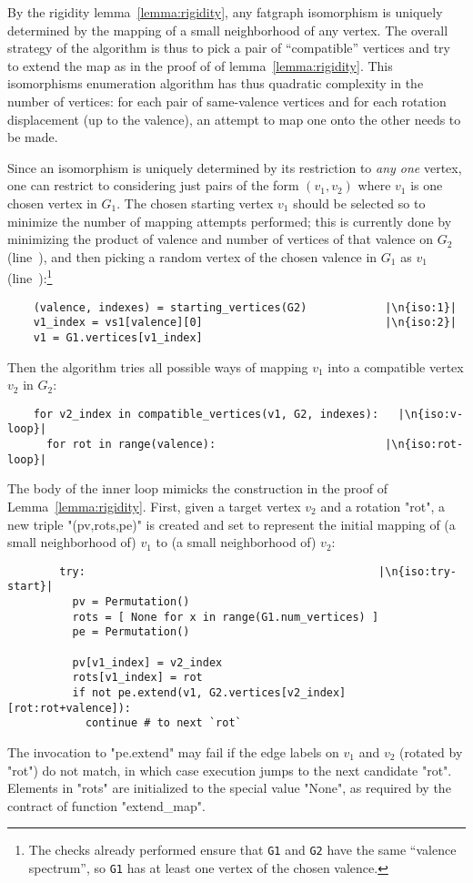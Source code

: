 By the rigidity lemma~\ref{lemma:rigidity}, any fatgraph isomorphism
is uniquely determined by the mapping of a small neighborhood of any
vertex.  The overall strategy of the algorithm is thus to pick a pair
of ``compatible'' vertices and try to extend the map as in the proof
of of lemma~\ref{lemma:rigidity}.  This isomorphisms enumeration
algorithm has thus quadratic complexity in the number of
vertices: for each pair of same-valence vertices and for each
rotation displacement (up to the valence), an attempt to map one onto
the other needs to be made.  

Since an isomorphism is uniquely determined by its restriction to
\emph{any one} vertex, one can restrict to considering just pairs of
the form $(v_1, v_2)$ where $v_1$ is one chosen vertex in $G_1$.  The
chosen starting vertex $v_1$ should be selected so to minimize the
number of mapping attempts performed; this is currently done by
minimizing the product of valence and number of vertices of that
valence on $G_2$ (line~), and then picking a random vertex
of the chosen valence in $G_1$ as $v_1$
(line~):\footnote{The checks already performed ensure that
  \Verb`G1` and \Verb`G2` have the same ``valence spectrum'', so
  \Verb`G1` has at least one vertex of the chosen valence.}
\begin{lstlisting}
    (valence, indexes) = starting_vertices(G2)            |\n{iso:1}|
    v1_index = vs1[valence][0]                            |\n{iso:2}|
    v1 = G1.vertices[v1_index]
\end{lstlisting}
Then the algorithm tries all possible ways of mapping $v_1$ into a
compatible vertex $v_2$ in $G_2$:
\begin{lstlisting}
    for v2_index in compatible_vertices(v1, G2, indexes):   |\n{iso:v-loop}|
      for rot in range(valence):                          |\n{iso:rot-loop}|
\end{lstlisting}
The body of the inner loop mimicks the construction in the proof
of Lemma~\ref{lemma:rigidity}.  First, given a target vertex $v_2$ and a
rotation "rot", a new triple "(pv,rots,pe)" is created and set to
represent the initial mapping of (a small neighborhood of) $v_1$ to (a
small neighborhood of) $v_2$:
\begin{lstlisting}
        try:                                             |\n{iso:try-start}|
          pv = Permutation()
          rots = [ None for x in range(G1.num_vertices) ]
          pe = Permutation()

          pv[v1_index] = v2_index
          rots[v1_index] = rot
          if not pe.extend(v1, G2.vertices[v2_index][rot:rot+valence]):
            continue # to next `rot`

\end{lstlisting}
The invocation to "pe.extend" may fail if the edge labels on $v_1$ and
$v_2$ (rotated by "rot") do not match, in which case execution jumps to
the next candidate "rot".
Elements in "rots" are initialized to the special value "None", as
required by the contract of function "extend_map".

